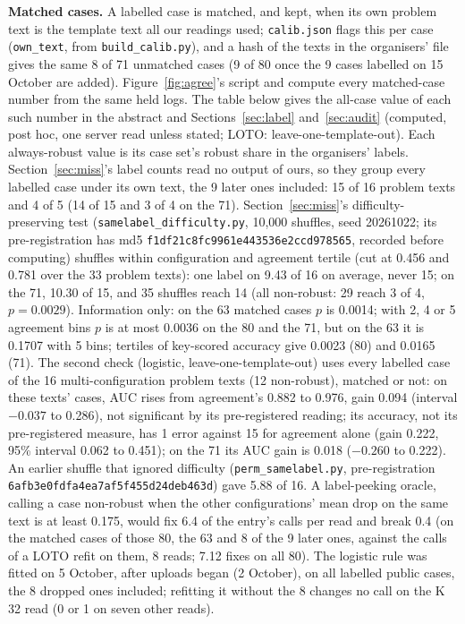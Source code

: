 \documentclass{article}
\begin{document}
\textbf{Matched cases.} A labelled case is matched, and kept, when its own problem text is the template text all our
readings used; \texttt{calib.json} flags this per case (\texttt{own\_text}, from \texttt{build\_calib.py}), and a hash
of the texts in the organisers' file gives the same 8 of 71 unmatched cases (9 of 80 once the 9 cases labelled on 15
October are added). Figure~\ref{fig:agree}'s script and  compute every
matched-case number from the same held logs. The table below gives the all-case value of each such number in the
abstract and Sections~\ref{sec:label} and~\ref{sec:audit} (computed, post hoc, one server read unless stated; LOTO:
leave-one-template-out). Each always-robust value is its case set's robust share in the organisers' labels.
Section~\ref{sec:miss}'s label counts read no output of ours, so they group every labelled case under its own text, the
9 later ones included: 15 of 16 problem texts and 4 of 5 (14 of 15 and 3 of 4 on the 71). Section~\ref{sec:miss}'s
difficulty-preserving test (\texttt{samelabel\_difficulty.py}, 10,000 shuffles, seed 20261022; its pre-registration has
md5 \texttt{f1df21c8fc9961e443536e2ccd978565}, recorded before computing) shuffles within configuration and agreement
tertile (cut at 0.456 and 0.781 over the 33 problem texts): one label on 9.43 of 16 on average, never 15; on the 71, 10.30 of
15, and 35 shuffles reach 14 (all non-robust: 29 reach 3 of 4, $p = 0.0029$). Information only: on the 63 matched cases $p$ is
0.0014; with 2, 4 or 5 agreement bins $p$ is at most 0.0036 on the 80 and the 71, but on the 63 it is 0.1707 with 5
bins; tertiles of key-scored accuracy give 0.0023 (80) and 0.0165 (71). The second check (logistic, leave-one-template-out) uses every labelled case of
the 16 multi-configuration problem texts (12 non-robust), matched or not: on these texts' cases, AUC rises from
agreement's 0.882 to 0.976, gain 0.094 (interval $-0.037$ to 0.286), not significant by its pre-registered reading;
its accuracy, not its pre-registered measure,
has 1 error against 15 for agreement alone (gain 0.222, 95\% interval 0.062 to 0.451); on the 71 its AUC gain is 0.018
($-0.260$ to 0.222). An earlier shuffle that ignored
difficulty (\texttt{perm\_samelabel.py}, pre-registration \texttt{6afb3e0fdfa4ea7af5f455d24deb463d}) gave 5.88 of 16.
A label-peeking oracle, calling a case non-robust when the other configurations' mean drop on the same text is at
least 0.175, would fix 6.4 of the entry's calls per read and break 0.4 (on the matched cases of those 80, the 63 and
8 of the 9 later ones, against the calls of a LOTO refit on them, 8 reads; 7.12 fixes on all 80). The logistic rule was
fitted on 5 October, after uploads began (2 October), on all labelled public cases, the 8 dropped ones included;
refitting it without the 8 changes no call on the K 32 read (0 or 1 on seven other reads).
\end{document}
